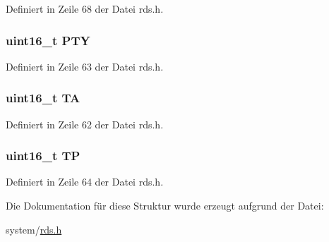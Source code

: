 Definiert in Zeile 68 der Datei rds.\+h.

\hypertarget{structgroup__0a_a0474967478fbbc2c71b800d2e0132d45}{}
\subsubsection[{P\+T\+Y}]{\setlength{\rightskip}{0pt plus 5cm}uint16\+\_\+t P\+T\+Y}\label{structgroup__0a_a0474967478fbbc2c71b800d2e0132d45}


Definiert in Zeile 63 der Datei rds.\+h.

\hypertarget{structgroup__0a_a6de7751205cef4ffcce610399a030892}{}
\subsubsection[{T\+A}]{\setlength{\rightskip}{0pt plus 5cm}uint16\+\_\+t T\+A}\label{structgroup__0a_a6de7751205cef4ffcce610399a030892}


Definiert in Zeile 62 der Datei rds.\+h.

\hypertarget{structgroup__0a_ab9e634c63b0d95a96716d5f6d7f06d72}{}
\subsubsection[{T\+P}]{\setlength{\rightskip}{0pt plus 5cm}uint16\+\_\+t T\+P}\label{structgroup__0a_ab9e634c63b0d95a96716d5f6d7f06d72}


Definiert in Zeile 64 der Datei rds.\+h.



Die Dokumentation für diese Struktur wurde erzeugt aufgrund der Datei\+:\begin{DoxyCompactItemize}
\item 
system/\hyperlink{rds_8h}{rds.\+h}\end{DoxyCompactItemize}
